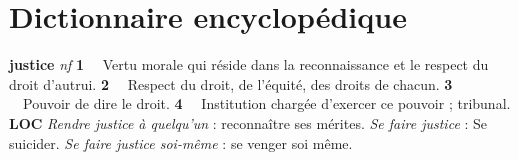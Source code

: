 
\section{Dictionnaire encyclopédique}

{\bf justice} {\it nf} {\bf 1} \ \ Vertu morale qui réside dans la reconnaissance et le respect du droit d'autrui. {\bf 2} \ \ Respect du droit, de l'équité, des droits de chacun. {\bf 3} \ \ Pouvoir de dire le droit. {\bf 4} \ \ Institution chargée d'exercer ce pouvoir ; tribunal.  {\bf \footnotesize LOC} {\it Rendre justice à quelqu'un} : reconnaître ses mérites. {\it Se faire justice} : Se suicider. {\it Se faire justice soi-même} : se venger soi même. 
